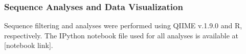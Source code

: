 \subsubsection{Sequence Analyses and Data Visualization}
Sequence filtering and analyses were performed using QIIME v.1.9.0 and R, respectively.  The IPython notebook file used for all analyses is available at [notebook link]. 

    